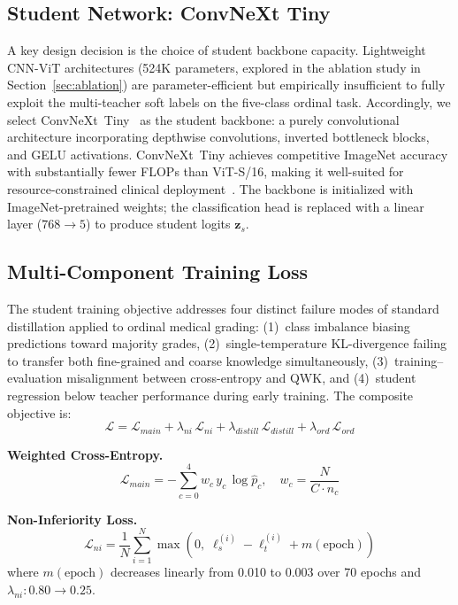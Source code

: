 \documentclass[10pt, twocolumn]{article}
\begin{document}
\subsection{Student Network: ConvNeXt Tiny}

A key design decision is the choice of student backbone capacity. Lightweight
CNN-ViT architectures (524K parameters, explored in the ablation study in
Section~\ref{sec:ablation}) are parameter-efficient but empirically insufficient
to fully exploit the multi-teacher soft labels on the five-class ordinal task.
Accordingly, we select ConvNeXt~Tiny~\cite{liu2022} as the student backbone: a
purely convolutional architecture incorporating depthwise convolutions, inverted
bottleneck blocks, and GELU activations. ConvNeXt~Tiny achieves competitive
ImageNet accuracy with substantially fewer FLOPs than ViT-S/16, making it
well-suited for resource-constrained clinical deployment~\cite{islam2023,yilmaz2025}.
The backbone is initialized with ImageNet-pretrained weights; the classification
head is replaced with a linear layer ($768{\to}5$) to produce student logits
$\mathbf{z}_s$.

\subsection{Multi-Component Training Loss}

The student training objective addresses four distinct failure modes of standard
distillation applied to ordinal medical grading: (1)~class imbalance biasing
predictions toward majority grades, (2)~single-temperature KL-divergence failing to
transfer both fine-grained and coarse knowledge simultaneously, (3)~training--evaluation
misalignment between cross-entropy and QWK, and (4)~student regression below teacher
performance during early training. The composite objective is:
\begin{equation}
  \mathcal{L} = \mathcal{L}_{main} + \lambda_{ni}\,\mathcal{L}_{ni} +
  \lambda_{distill}\,\mathcal{L}_{distill} + \lambda_{ord}\,\mathcal{L}_{ord}
\end{equation}

\textbf{Weighted Cross-Entropy.}
\begin{equation}
  \mathcal{L}_{main} = -\sum_{c=0}^{4} w_c\, y_c\, \log\hat{p}_c, \quad
  w_c = \frac{N}{C \cdot n_c}
\end{equation}

\textbf{Non-Inferiority Loss.}
\begin{equation}
  \mathcal{L}_{ni} = \frac{1}{N}\sum_{i=1}^{N}
  \max\!\left(0,\; \ell_s^{(i)} - \ell_t^{(i)} + m(\text{epoch})\right)
\end{equation}
where $m(\text{epoch})$ decreases linearly from 0.010 to 0.003 over 70 epochs and
$\lambda_{ni}: 0.80 \to 0.25$.
\end{document}
